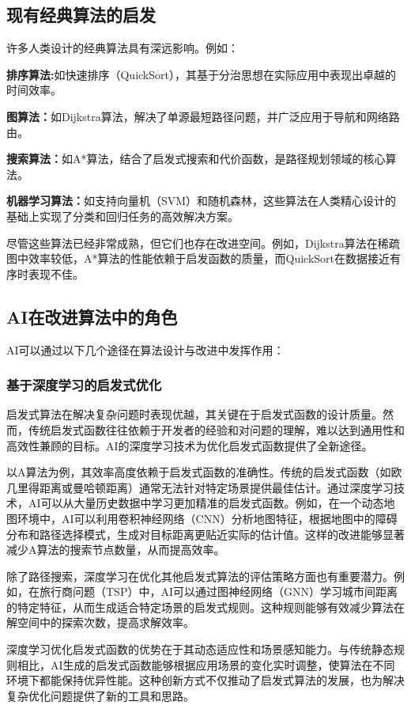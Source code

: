 \documentclass[supercite]{HustGraduPaper}
\begin{document}
	\subsection{现有经典算法的启发}
	许多人类设计的经典算法具有深远影响。例如：
	\par {\songti \bfseries 排序算法:}如快速排序（QuickSort），其基于分治思想在实际应用中表现出卓越的时间效率。
	\par {\songti \bfseries 图算法：}如Dijkstra算法，解决了单源最短路径问题，并广泛应用于导航和网络路由。
	\par {\songti \bfseries 搜索算法：}如A*算法，结合了启发式搜索和代价函数，是路径规划领域的核心算法。
	\par {\songti \bfseries 机器学习算法：}如支持向量机（SVM）和随机森林，这些算法在人类精心设计的基础上实现了分类和回归任务的高效解决方案。
	\par 尽管这些算法已经非常成熟，但它们也存在改进空间。例如，Dijkstra算法在稀疏图中效率较低，A*算法的性能依赖于启发函数的质量，而QuickSort在数据接近有序时表现不佳。

	\subsection{AI在改进算法中的角色}
	AI可以通过以下几个途径在算法设计与改进中发挥作用：
	\subsubsection{\songti \bfseries 基于深度学习的启发式优化}
启发式算法在解决复杂问题时表现优越，其关键在于启发式函数的设计质量。然而，传统启发式函数往往依赖于开发者的经验和对问题的理解，难以达到通用性和高效性兼顾的目标。AI的深度学习技术为优化启发式函数提供了全新途径。

以A算法为例，其效率高度依赖于启发式函数的准确性。传统的启发式函数（如欧几里得距离或曼哈顿距离）通常无法针对特定场景提供最佳估计。通过深度学习技术，AI可以从大量历史数据中学习更加精准的启发式函数。例如，在一个动态地图环境中，AI可以利用卷积神经网络（CNN）分析地图特征，根据地图中的障碍分布和路径选择模式，生成对目标距离更贴近实际的估计值。这样的改进能够显著减少A算法的搜索节点数量，从而提高效率。

除了路径搜索，深度学习在优化其他启发式算法的评估策略方面也有重要潜力。例如，在旅行商问题（TSP）中，AI可以通过图神经网络（GNN）学习城市间距离的特定特征，从而生成适合特定场景的启发式规则。这种规则能够有效减少算法在解空间中的探索次数，提高求解效率。

深度学习优化启发式函数的优势在于其动态适应性和场景感知能力。与传统静态规则相比，AI生成的启发式函数能够根据应用场景的变化实时调整，使算法在不同环境下都能保持优异性能。这种创新方式不仅推动了启发式算法的发展，也为解决复杂优化问题提供了新的工具和思路。
\end{document}
